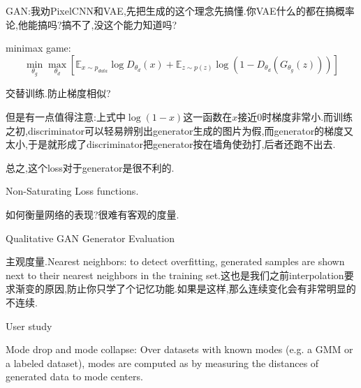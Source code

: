 	GAN:我劝PixelCNN和VAE,先把生成的这个理念先搞懂.你VAE什么的都在搞概率论,他能搞吗?搞不了,没这个能力知道吗?
	
	minimax game:
	\begin{equation}
		\min _{\theta_{g}} \max _{\theta_{d}}\left[\mathbb{E}_{x \sim p_{d a t a}} \log D_{\theta_{d}}(x)+\mathbb{E}_{z \sim p(z)} \log \left(1-D_{\theta_{d}}\left(G_{\theta_{g}}(z)\right)\right)\right]
	\end{equation}

	交替训练.防止梯度相似?
	
	但是有一点值得注意:上式中$\log(1-x)$这一函数在$x$接近$0$时梯度非常小.而训练之初,discriminator可以轻易辨别出generator生成的图片为假,而generator的梯度又太小,于是就形成了discriminator把generator按在墙角使劲打,后者还跑不出去.
	
	
	
	总之,这个loss对于generator是很不利的.
	
	Non-Saturating Loss functions.
	
	如何衡量网络的表现?很难有客观的度量.
	
	Qualitative GAN Generator Evaluation
	
	主观度量.Nearest neighbors: to detect overfitting, generated samples are shown next to their nearest neighbors in the training set.这也是我们之前interpolation要求渐变的原因,防止你只学了个记忆功能.如果是这样,那么连续变化会有非常明显的不连续.
	
	User study
	
	Mode drop and mode collapse: Over datasets with known modes (e.g. a GMM or a labeled dataset), modes are computed as by measuring the distances of generated data to mode centers.
	
